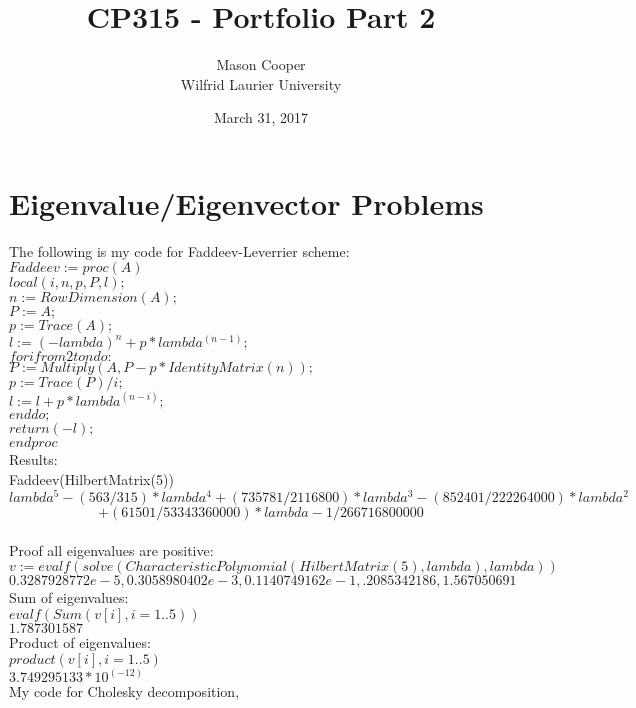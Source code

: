 \documentclass[12pt]{article}
\begin{document}
\title{CP315 - Portfolio Part 2}
\date{March 31, 2017}
\author{Mason Cooper\\ Wilfrid Laurier University}
\maketitle
\clearpage
\tableofcontents
\clearpage

\section{Eigenvalue/Eigenvector Problems}
The following is my code for Faddeev-Leverrier scheme:\\

$Faddeev:=proc(A)$\\
$local(i, n, p, P, l);$\\
$n := RowDimension(A);$\\
$P := A;$\\
$p := Trace(A);$\\
$l := (-lambda)^n+p*lambda^(n-1);$\\
$for i from 2 to n do:$\\
$P := Multiply(A, P-p*IdentityMatrix(n));$\\
$p := Trace(P)/i;$\\
$l := l+p*lambda^(n-i);$\\
$end do;$\\
$return(-l);$\\
$end proc$\\


Results:\\
Faddeev(HilbertMatrix(5))
$$lambda^5-(563/315)*lambda^4+(735781/2116800)*lambda^3-(852401/222264000)*lambda^2$$
$$+(61501/53343360000)*lambda-1/266716800000$$\\

Proof all eigenvalues are positive:\\
$v:=evalf(solve(CharacteristicPolynomial(HilbertMatrix(5), lambda), lambda))$\\
$0.3287928772e-5, 0.3058980402e-3, 0.1140749162e-1, .2085342186, 1.567050691$\\

Sum of eigenvalues:\\
$evalf(Sum(v[i], i = 1 .. 5))$\\
$1.787301587$\\

Product of eigenvalues:\\
$product(v[i], i = 1 .. 5)$\\
$3.749295133*10^(-12)$\\
\clearpage
My code for Cholesky decomposition,
\end{document}
